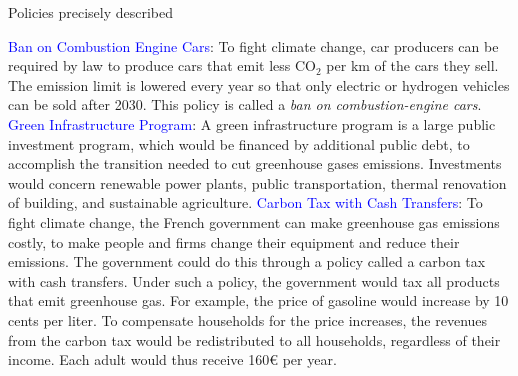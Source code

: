 \begin{framefont}{\small}
\begin{frame}{Policies precisely described}%
\begin{itemize}
\ip \textcolor{blue}{Ban on Combustion Engine Cars}: To fight climate change, car producers can be required by law to produce cars that emit less CO$_\text{2}$ per km of the cars they sell. The emission limit is lowered every year so that only electric or hydrogen vehicles can be sold after 2030. This policy is called a \textit{ban on combustion-engine cars}.
\ip \textcolor{blue}{Green Infrastructure Program}: A green infrastructure program is a large public investment program, which would be financed by additional public debt, to accomplish the transition needed to cut greenhouse gases emissions. Investments would concern renewable power plants, public transportation, thermal renovation of building, and sustainable agriculture.
\ip \textcolor{blue}{Carbon Tax with Cash Transfers}: To fight climate change, the French government can make greenhouse gas emissions costly, to make people and firms change their equipment and reduce their emissions. The government could do this through a policy called a carbon tax with cash transfers. Under such a policy, the government would tax all products that emit greenhouse gas. For example, the price of gasoline would increase by 10 cents per liter. To compensate households for the price increases, the revenues from the carbon tax would be redistributed to all households, regardless of their income. Each adult would thus receive 160\euro{} per year.
\end{itemize}
\end{frame}


\end{framefont}
